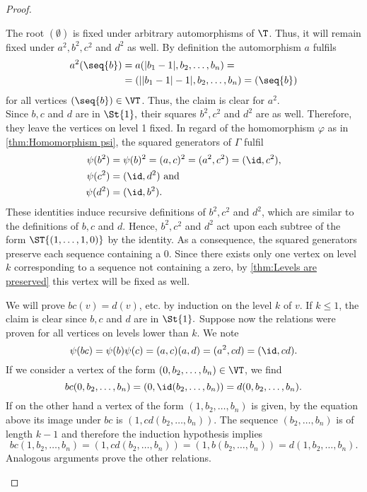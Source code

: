 \begin{proof}
\begin{plist}
\item The root $(\emptyset)$ is fixed under arbitrary automorphisms of $\T$. Thus, it will remain fixed under $a^2,b^2,c^2$ and $d^2$ as well. By definition the automorphism $a$ fulfils
\begin{align*}
a^2(\seq{b})	&=a(\lvert b_1-1\rvert,b_2,\ldots,b_n)=\\
			&=(\lvert\lvert b_1-1\rvert-1\rvert,b_2,\ldots,b_n)=(\seq{b})
\end{align*}
for all vertices $(\seq{b})\in\VT$. Thus, the claim is clear for $a^2.$\\
Since $b,c$ and $d$ are in $\St{1},$ their squares $b^2,c^2$ and $d^2$ are as well. Therefore, they leave the vertices on level 1 fixed. In regard of the homomorphism $\varphi$ as in \cref{thm:Homomorphism psi}, the squared generators of $\Gamma$ fulfil
\begin{align*}
\psi(b^2)	&=\psi(b)^2=(a,c)^2=(a^2,c^2)=(\id,c^2),\\
\psi(c^2)	&=(\id,d^2) \text{ and}\\
\psi(d^2)	&=(\id,b^2).
\end{align*}
These identities induce recursive definitions of $b^2,c^2$ and $d^2$, which are similar to the definitions of $b,c$ and $d$. Hence, $b^2,c^2$ and $d^2$ act upon each subtree of the form $\ST{(1,\ldots,1,0)}$ by the identity. As a consequence, the squared generators preserve each sequence containing a 0. Since there exists only one vertex on level $k$ corresponding to a sequence not containing a zero, by \cref{thm:Levels are preserved} this vertex will be fixed as well.
\item We will prove $bc(v)=d(v)$, etc. by induction on the level $k$ of $v$.  If $k\leq 1$, the claim is clear since $b,c$ and $d$ are in $\St{1}.$ Suppose now the relations were proven for all vertices on levels lower than $k.$ We note
\begin{equation*}
\psi(bc)=\psi(b)\psi(c)=(a,c)(a,d)=(a^2,cd)=(\id,cd).
\end{equation*}
If we consider a vertex of the form $(0,b_2,\ldots,b_n)\in\VT$, we find
\begin{equation*}
bc(0,b_2,\ldots,b_n)=(0,\id(b_2,\ldots,b_n))=d(0,b_2,\ldots,b_n).
\end{equation*}
If on the other hand a vertex of the form $(1,b_2,\ldots,b_n)$ is given, by the equation above its image under $bc$ is  $(1,cd(b_2,\ldots,b_n)).$ The sequence $(b_2,\ldots,b_n)$ is of length $k-1$ and therefore the induction hypothesis implies
\begin{equation*}
bc(1,b_2,\ldots,b_n)=(1,cd(b_2,\ldots,b_n))=(1,b(b_2,\ldots,b_n))=d(1,b_2,\ldots,b_n).
\end{equation*}
Analogous arguments prove the other relations.
\end{plist}
\end{proof}

